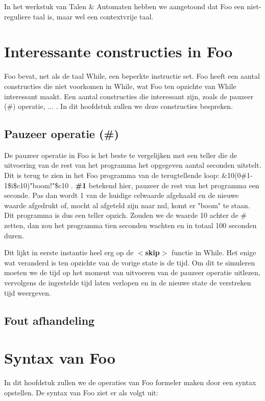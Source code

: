 \documentclass[11pt]{article}
\begin{document}
In het werkstuk van Talen \& Automaten hebben we aangetoond dat Foo een niet-reguliere taal is, maar wel een contextvrije taal.

\section{Interessante constructies in Foo}

Foo bevat, net als de taal While, een beperkte instructie set. 
Foo heeft een aantal constructies die niet voorkomen in While, wat Foo ten opzichte van While interessant maakt.
Een aantal constructies die interessant zijn, zoals de pauzeer (\#) operatie, ... . 
In dit hoofdstuk zullen we deze constructies bespreken.

\subsection{Pauzeer operatie (\#)}
De pauzeer operatie in Foo is het beste te vergelijken met een teller die de uitvoering van de rest van het programma het opgegeven aantal seconden uitstelt. 
Dit is terug te zien in het Foo programma van de terugtellende loop: \&10(0\#1-1\$i\$c10)"boom!"\$c10 .
{\bf \#1} betekend hier, pauzeer de rest van het programma een seconde. 
Pas dan wordt 1 van de huidige celwaarde afgehaald en de nieuwe waarde afgedrukt of, mocht al afgeteld zijn naar nul, komt er "boom" te staan.
Dit programma is dus een teller opzich.
Zouden we de waarde 10 achter de \# zetten, dan zou het programma tien seconden wachten en in totaal 100 seconden duren.


Dit lijkt in eerste instantie heel erg op de {\bf\(<\)skip\(>\)} functie in While.
Het enige wat veranderd is ten opzichte van de vorige state is de tijd.
Om dit te simuleren moeten we de tijd op het moment van uitvoeren van de pauzeer operatie uitlezen, vervolgens de ingestelde tijd laten verlopen en in de nieuwe state de verstreken tijd weergeven.

\subsection{Fout afhandeling}

\section{Syntax van Foo}
In dit hoofdstuk zullen we de operaties van Foo formeler maken door een syntax opstellen. 
De syntax van Foo ziet er als volgt uit:
\newline
\end{document}
